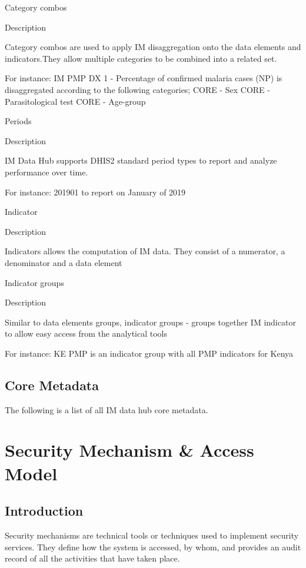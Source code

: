 \documentclass[]{book}
\begin{document}
Category combos

Description

Category combos are used to apply IM disaggregation onto the data elements and indicators.They allow multiple categories to be combined into a related set.

For instance: IM PMP DX 1 - Percentage of confirmed malaria cases (NP) is disaggregated according to the following categories; CORE - Sex \textbar{} CORE - Parasitological test \textbar{} CORE - Age-group

Periods

Description

IM Data Hub supports DHIS2 standard period types to report and analyze performance over time.

For instance: 201901 to report on January of 2019

Indicator

Description

Indicators allows the computation of IM data. They consist of a numerator, a denominator and a data element

Indicator groups

Description

Similar to data elements groups, indicator groups - groups together IM indicator to allow easy access from the analytical tools

For instance: KE PMP is an indicator group with all PMP indicators for Kenya

\hypertarget{core-metadata}{%
\section{Core Metadata}\label{core-metadata}}

The following is a list of all IM data hub core metadata.

\hypertarget{access}{%
\chapter{Security Mechanism \& Access Model}\label{access}}

\hypertarget{introduction-3}{%
\section{Introduction}\label{introduction-3}}

Security mechanisms are technical tools or techniques used to implement security services. They define how the system is accessed, by whom, and provides an audit record of all the activities that have taken place.
\end{document}
